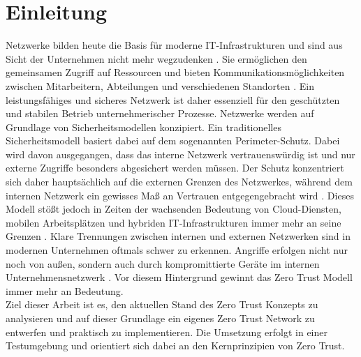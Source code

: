 \documentclass[lettersize,journal]{IEEEtran}
\begin{document}
\section{Einleitung}
Netzwerke bilden heute die Basis für moderne IT-Infrastrukturen und sind aus Sicht der Unternehmen nicht mehr wegzudenken \cite{Afolalu.2025}. Sie ermöglichen den gemeinsamen Zugriff auf Ressourcen und bieten Kommunikationsmöglichkeiten zwischen Mitarbeitern, Abteilungen und verschiedenen Standorten \Cites[3]{Schreiner.2023}. Ein leistungsfähiges und sicheres Netzwerk ist daher essenziell für den geschützten und stabilen Betrieb unternehmerischer Prozesse. 
Netzwerke werden auf Grundlage von Sicherheitsmodellen konzipiert. Ein traditionelles Sicherheitsmodell basiert dabei auf dem sogenannten Perimeter-Schutz. Dabei wird davon ausgegangen, dass das interne Netzwerk vertrauenswürdig ist und nur externe Zugriffe besonders abgesichert werden müssen. Der Schutz konzentriert sich daher hauptsächlich auf die externen Grenzen des Netzwerkes, während dem internen Netzwerk ein gewisses Maß an Vertrauen entgegengebracht wird \cite{cloudflare.com.2025}.
Dieses Modell stößt jedoch in Zeiten der wachsenden Bedeutung von Cloud-Diensten, mobilen Arbeitsplätzen und hybriden IT-Infrastrukturen immer mehr an seine Grenzen \cite[29]{Riepen.2022131}. Klare Trennungen zwischen internen und externen Netzwerken sind in modernen Unternehmen oftmals schwer zu erkennen. Angriffe erfolgen nicht nur noch von außen, sondern auch durch kompromittierte Geräte im internen Unternehmensnetzwerk \cite{Horne.2021}. Vor diesem Hintergrund gewinnt das Zero Trust Modell immer mehr an Bedeutung.\\
Ziel dieser Arbeit ist es, den aktuellen Stand des Zero Trust Konzepts zu analysieren und auf dieser Grundlage ein eigenes Zero Trust Network zu entwerfen und praktisch zu implementieren. Die Umsetzung erfolgt in einer Testumgebung und orientiert sich dabei an den Kernprinzipien von Zero Trust.
\end{document}
